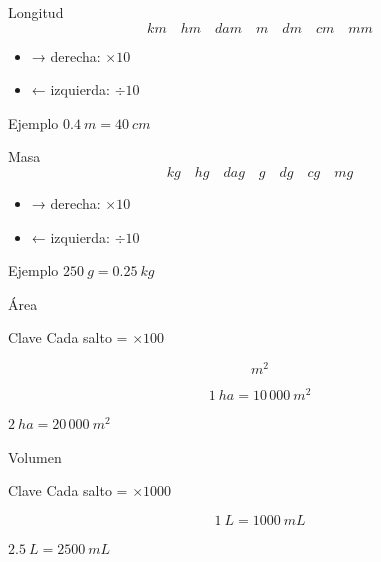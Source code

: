 \documentclass[aspectratio=169,10pt]{beamer}
\begin{document}
	\begin{frame}{Longitud}
		\[
		km \quad hm \quad dam \quad m \quad dm \quad cm \quad mm
		\]
		
		\begin{itemize}[<+->]
			\item → derecha: $\times 10$
			\item ← izquierda: $\div 10$
		\end{itemize}
		
		\pause
		\begin{exampleblock}{Ejemplo}
			\(0.4\ m = 40\ cm\)
		\end{exampleblock}
	\end{frame}
	
	\begin{frame}{Masa}
		\[
		kg \quad hg \quad dag \quad g \quad dg \quad cg \quad mg
		\]
		
		\begin{itemize}[<+->]
			\item → derecha: $\times 10$
			\item ← izquierda: $\div 10$
		\end{itemize}
		
		\pause
		\begin{exampleblock}{Ejemplo}
			\(250\ g = 0.25\ kg\)
		\end{exampleblock}
	\end{frame}
	
	\begin{frame}{Área}
		\begin{block}{Clave}
			Cada salto = $\times 100$
		\end{block}
		
		\[
		m^2
		\]
		
		\pause
		\[
		1\ ha = 10\,000\ m^2
		\]
		
		\pause
		\begin{exampleblock}
			\(2\ ha = 20\,000\ m^2\)
		\end{exampleblock}
	\end{frame}
	
	\begin{frame}{Volumen}
		\begin{block}{Clave}
			Cada salto = $\times 1000$
		\end{block}
		
		\pause
		\[
		1\ L = 1000\ mL
		\]
		
		\pause
		\begin{exampleblock}
			\(2.5\ L = 2500\ mL\)
		\end{exampleblock}
	\end{frame}
	
\end{document}
